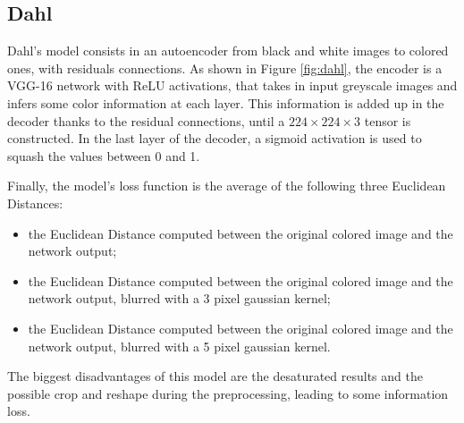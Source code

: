 \subsection{Dahl}

Dahl's model consists in an autoencoder from black and white images to colored ones, with
residuals connections.
As shown in Figure \ref{fig:dahl}, the encoder is a VGG-16 network with ReLU activations, that takes in input
greyscale images and infers some color information at each layer. This information is added up in the decoder
thanks to the residual connections, until a $224 \times 224 \times 3$ tensor is constructed. In the last layer
of the decoder, a sigmoid activation is used to squash the values between 0 and 1.

Finally, the model's loss function is the average of the following three Euclidean Distances:
\begin{itemize}
    \item the Euclidean Distance computed between the original colored image and the network output;
    \item the Euclidean Distance computed between the original colored image and the network output, blurred with a 3 pixel gaussian kernel;
    \item the Euclidean Distance computed between the original colored image and the network output, blurred with a 5 pixel gaussian kernel.
\end{itemize}

The biggest disadvantages of this model are the desaturated results and the possible crop and reshape during the
preprocessing, leading to some information loss.
